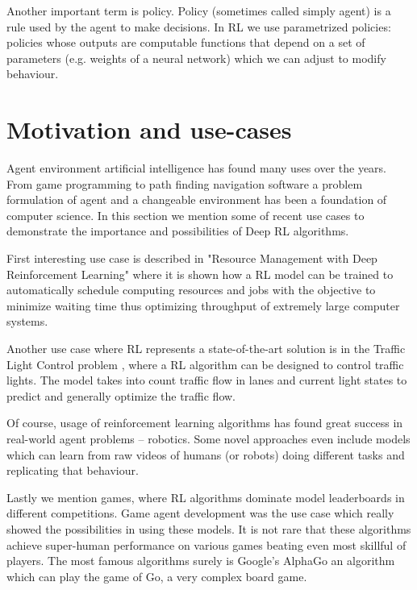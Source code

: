 \documentclass[b5paper]{book}
\let\cite\parencite
\begin{document}
Another important term is policy. Policy (sometimes called simply agent) is a rule used by the agent to make decisions. In RL we use parametrized policies: policies whose outputs are computable functions that depend on a set of parameters (e.g. weights of a neural network) which we can adjust to modify behaviour. 


\section{Motivation and use-cases} 


Agent environment artificial intelligence has found many uses over the years. From game programming to path finding navigation software a problem formulation of agent and a changeable environment has been a foundation of computer science. In this section we mention some of recent use cases to demonstrate the importance and possibilities of Deep RL algorithms.

First interesting use case is described in "Resource Management with Deep Reinforcement Learning" \cite{mao2016resource} where it is shown how a RL model can be trained to automatically schedule computing resources and jobs with the objective to minimize waiting time thus optimizing throughput of extremely large computer systems.

Another use case where RL represents a state-of-the-art solution is in the Traffic Light Control problem \cite{wiering2000multi}, where a RL algorithm can be designed to control traffic lights. The model takes into count traffic flow in lanes and current light states to predict and generally optimize the traffic flow.

Of course, usage of reinforcement learning algorithms has found great success in real-world agent problems -- robotics. Some novel approaches even include models which can learn from raw videos of humans (or robots) doing different tasks and replicating that behaviour. \cite{mnih2015human}

Lastly we mention games, where RL algorithms dominate model leaderboards in different competitions. \cite{mnih2013playing} \cite{silver2016mastering} Game agent development was the use case which really showed the possibilities in using these models. It is not rare that these algorithms achieve super-human performance on various games beating even most skillful of players. The most famous algorithms surely is Google's AlphaGo an algorithm which can play the game of Go, a very complex board game.
\end{document}
